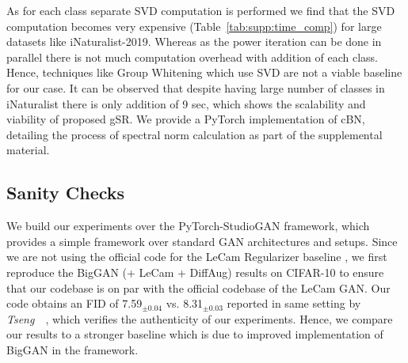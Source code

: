 \documentclass[runningheads,table]{llncs}
\begin{document}
 As for each class separate SVD computation is performed we find that the SVD computation becomes very expensive (Table~\ref{tab:supp:time_comp}) for large datasets like iNaturalist-2019. Whereas as the power iteration can be done in parallel there is not much computation overhead with addition of each class. Hence, techniques like Group Whitening \cite{huang2021group} which use SVD are not a viable baseline for our case. It can be observed that despite having large number of classes in iNaturalist there is only addition of 9 sec, which shows the scalability and viability of proposed gSR. We provide a PyTorch implementation of cBN, detailing the process of spectral norm calculation as part of the supplemental material.

\subsection{Sanity Checks}
\label{subsec:supp:sanity}

We build our experiments over the PyTorch-StudioGAN framework, which provides a simple framework over standard GAN architectures and setups. Since we are not using the official code for the LeCam Regularizer baseline \cite{tseng2021regularizing}, we first reproduce the BigGAN (+ LeCam + DiffAug) results on CIFAR-10 to ensure that our codebase is on par with the official codebase of the LeCam GAN. Our code obtains an FID of 7.59$_{\pm 0.04}$ vs. 8.31$_{\pm 0.03}$ reported in same setting by \textit{Tseng}~\etal~\cite{tseng2021regularizing}, which verifies the authenticity of our experiments. Hence, we compare our results to a stronger baseline which is due to improved implementation of BigGAN in the framework.
\end{document}

